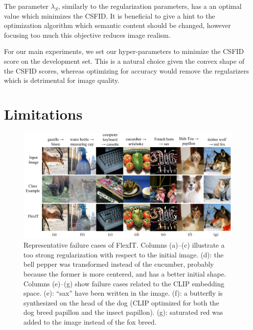 The parameter $\lambda_S$, similarly to the regularization parameters, has a an optimal
 value which minimizes the \ac{CSFID}. It is beneficial to give a hint to the optimization 
 algorithm which semantic content should be changed, however focusing too much this 
 objective reduces image realism.

For our main experiments, we set our hyper-parameters to  minimize the \ac{CSFID} score on 
the development set. This is a natural choice given the convex shape of the \ac{CSFID} 
scores, whereas optimizing for accuracy  would   remove the regularizers which is 
detrimental for image quality.


\section{Limitations}

\begin{figure}[h]
    \center
    \includegraphics[width=\linewidth]{images/flexit/assets/failures.pdf}
    \caption{
    Representative failure cases of FlexIT. 
    Columns (a)--(c) illustrate a too strong regularization with respect to the initial image. 
    (d): the bell pepper was transformed instead of the cucumber, probably because the former is more centered, and has a better initial shape. 
    Columns (e)--(g) show failure cases related to the \ac{CLIP} embedding space. 
    (e): ``sax'' have been written in the image. 
    (f): a butterfly is synthesized on the head of the dog (\ac{CLIP} optimized for both the dog breed papillon and the insect papillon). 
    (g): saturated red was added to the image instead of the fox breed.
    }
\label{fig:failures}
\end{figure}

